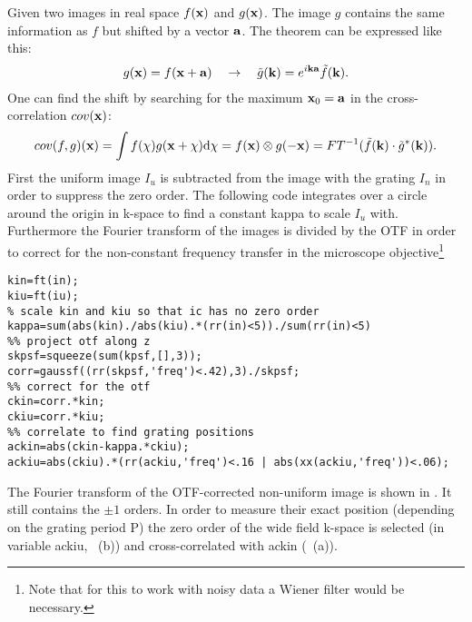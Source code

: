 Given two images in real space $f(\mathbf{x})$ and $g(\mathbf{x})$. The
image $g$ contains the same information as $f$ but shifted by a vector
$\mathbf{a}$. The theorem can be expressed like this:
\begin{align}
  g(\mathbf{x})=f(\mathbf{x}+\mathbf{a})
  \quad
  \rightarrow
  \quad
  \tilde g(\mathbf{k})=e^{i\mathbf{k}\mathbf{a}}\tilde f(\mathbf{k}).
\end{align}
One can find the shift by searching for the maximum $\mathbf{x}_0=\mathbf{a}$ in
the cross-correlation $cov(\mathbf{x})$:
\begin{align}
  cov(f,g)(\mathbf{x})
  =\int f(\mathbf{\chi}) g(\mathbf{x}+\mathbf{\chi}) \textrm{d}\mathbf{\chi}
  =f(\mathbf{x})\otimes g(-\mathbf{x})
  =FT^{-1}(\tilde f(\mathbf{k})\cdot\tilde g^*(\mathbf{k})).
\end{align}
First the uniform image $I_u$ is subtracted from the image with the
grating $I_n$ in order to suppress the zero order. The following code
integrates over a circle around the origin in k-space to find a
constant {\sf kappa} to scale $I_u$ with. Furthermore the
Fourier transform of the images is divided by the OTF in order to
correct for the non-constant frequency transfer in the microscope
objective\footnote{Note that for this to work with noisy data a
  Wiener filter would be necessary.}
\begin{lstlisting}
kin=ft(in);
kiu=ft(iu);
% scale kin and kiu so that ic has no zero order
kappa=sum(abs(kin)./abs(kiu).*(rr(in)<5))./sum(rr(in)<5)
%% project otf along z
skpsf=squeeze(sum(kpsf,[],3));
corr=gaussf((rr(skpsf,'freq')<.42),3)./skpsf;
%% correct for the otf
ckin=corr.*kin;
ckiu=corr.*kiu;
%% correlate to find grating positions
ackin=abs(ckin-kappa.*ckiu);
ackiu=abs(ckiu).*(rr(ackiu,'freq')<.16 | abs(xx(ackiu,'freq'))<.06);
\end{lstlisting}
The Fourier transform of the OTF-corrected non-uniform image is shown
in . It still contains the $\pm1$ orders. In order
to measure their exact position (depending on the grating period {\sf
  P}) the zero order of the wide field k-space is selected (in variable
{\sf ackiu}, ~(b)) and cross-correlated with {\sf
  ackin} (~(a)).

